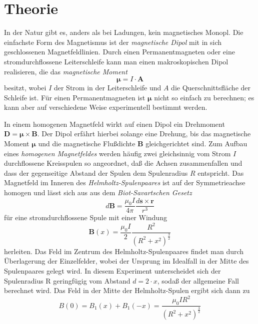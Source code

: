 \section{Theorie}
\label{sec:Theorie}
In der Natur gibt es, anders als bei Ladungen, kein magnetisches Monopl.
Die einfachste Form des Magnetismus ist der \textit{magnetische Dipol} mit in sich geschlossenen Magnetfeldlinien.
Durch einen Permanentmagneten oder eine stromdurchflossene Leiterschleife kann man einen makroskopischen Dipol realisieren,
die das \textit{magnetische Moment}
\begin{equation}
    \symbf{\mu} = I \cdot \symbf{A}
\end{equation}
besitzt, wobei $I$ der Strom in der Leiterschleife und $A$ die Querschnittsfläche der Schleife ist.
Für einen Permanentmagneten ist $\symbf{\mu}$ nicht so einfach zu berechnen; es kann aber auf verschiedene Weise experimentell bestimmt werden.

In einem homogenen Magnetfeld wirkt auf einen Dipol ein Drehmoment $\symbf{D} = \symbf{\mu} \times \symbf{B} $. Der Dipol erfährt hierbei solange eine Drehung, bis das magnetische Moment $\symbf{\mu}$ und die magnetische Flußdichte $\symbf{B}$ gleichgerichtet sind. 
Zum Aufbau eines \textit{homogenen Magnetfeldes} werden häuﬁg zwei gleichsinnig vom Strom $I$ durchﬂossene Kreisspulen so angeordnet, daß die Achsen zusammenfallen und dass der gegenseitige Abstand der Spulen dem Spulenradius $R$ entspricht. 
Das Magnetfeld im Inneren des \textit{Helmholtz-Spulenpaares} ist auf der Symmetrieachse homogen und lässt sich aus aus dem \textit{Biot-Savartschen Gesetz}
\begin{equation}
    d\symbf{B} = \frac{\mu_0 I}{4 \pi} \frac{d\symbf{s} \times \symbf{r}}{r^3}
\end{equation}
für eine stromdurchflossene Spule mit einer Windung
\begin{equation}
    \symbf{B}(x) = \frac{\mu_0 I}{2} \frac{R^2}{(R^2 + x^2)^{\frac{3}{2}}} 
\end{equation}
herleiten. Das Feld im Zentrum des Helmholtz-Spulenpaares ﬁndet man durch Überlagerung der Einzelfelder, wobei der Ursprung im Idealfall in der Mitte des Spulenpaares gelegt wird. 
In diesem Experiment unterscheidet sich der Spulenradius R geringfügig vom Abstand $d = 2·x$, sodaß der allgemeine Fall berechnet wird. Das Feld in der Mitte der Helmholtz-Spulen ergibt sich dann zu
\begin{equation}
    B(0) = B_1 (x) + B_1 (-x) = \frac{\mu_0 I R^2}{(R^2 + x^2)^{\frac{3}{2}}}
\end{equation}


